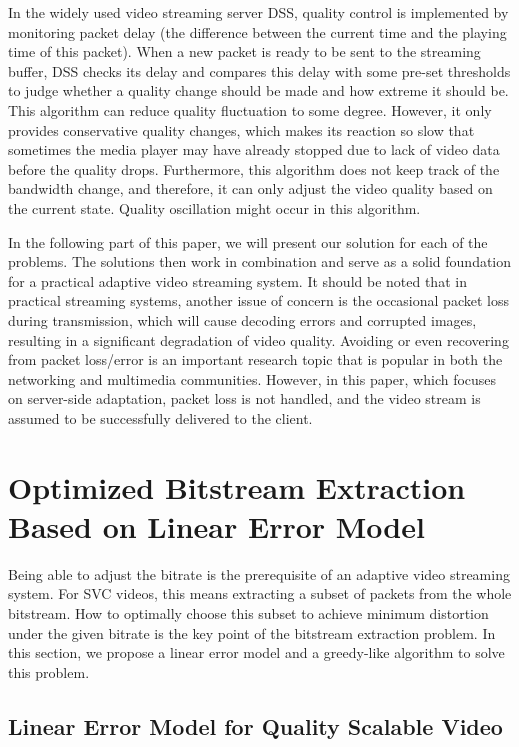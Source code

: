 \documentclass[journal,draftclsnofoot,onecolumn]{IEEEtran}
\begin{document}
In the widely used video streaming server DSS, quality control is implemented by monitoring packet delay (the difference between the current time and the playing time of this packet). When a new packet is ready to be sent to the streaming buffer, DSS checks its delay and compares this delay with some pre-set thresholds to judge whether a quality change should be made and how extreme it should be. This algorithm can reduce quality fluctuation to some degree. However, it only provides conservative quality changes, which makes its reaction so slow that sometimes the media player may have already stopped due to lack of video data before the quality drops. Furthermore, this algorithm does not keep track of the bandwidth change, and therefore, it can only adjust the video quality based on the current state. Quality oscillation might occur in this algorithm.

In the following part of this paper, we will present our solution for each of the problems. The solutions then work in combination and serve as a solid foundation for a practical adaptive video streaming system. It should be noted that in practical streaming systems, another issue of concern is the occasional packet loss during transmission, which will cause decoding errors and corrupted images, resulting in a significant degradation of video quality. Avoiding or even recovering from packet loss/error is an important research topic that is popular in both the networking and multimedia communities. However, in this paper, which focuses on server-side adaptation, packet loss is not handled, and the video stream is assumed to be successfully delivered to the client.

\section{Optimized Bitstream Extraction Based on Linear Error Model}
\label{sec:bitstream-extraction}

Being able to adjust the bitrate is the prerequisite of an adaptive video streaming system. For SVC videos, this means extracting a subset of packets from the whole bitstream. How to optimally choose this subset to achieve minimum distortion under the given bitrate is the key point of the bitstream extraction problem. In this section, we propose a linear error model and a greedy-like algorithm to solve this problem.

\subsection{Linear Error Model for Quality Scalable Video}
\label{subsec:linear-model}
\end{document}
